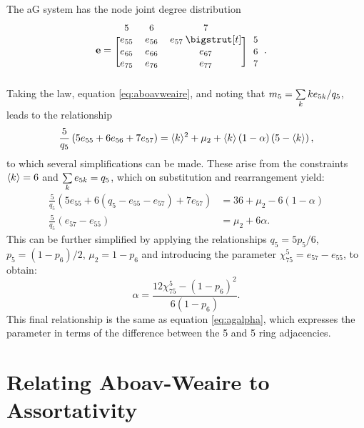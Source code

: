 The aG system has the node joint degree distribution
\begin{align}
	\mathbf{e} &= \begin{blockarray}{*{3}{c} l}
	\begin{block}{*{3}{>{$\footnotesize}c<{$}} l}
	5 & 6 & 7 \\
	\end{block}
	\begin{block}{[*{3}{c}]>{$\footnotesize}l<{$}}
	e_{55} & e_{56} & e_{57} \: \bigstrut[t]& 5\\
	e_{65} & e_{66} & e_{67} & 6 \\
	e_{75} & e_{76} & e_{77} & 7\\
	\end{block}
	\end{blockarray} .
\end{align}
Taking the \aw{} law, equation \eqref{eq:aboavweaire}, and noting that $m_5=\sum\limits_k ke_{5k}/q_5$, leads to the relationship
\begin{equation}
	\frac{5}{q_5}\left(5e_{55}+6e_{56}+7e_{57}\right) = \langle k \rangle^2+\mu_2+\langle k \rangle\left(1-\alpha\right)\left(5-\langle k \rangle\right),
\end{equation}
to which several simplifications can be made.
These arise from the constraints $\langle k \rangle=6$ and $\sum\limits_k e_{5k}=q_5$, which on substitution and rearrangement yield:
\begin{align}
	\frac{5}{q_5}\left(5e_{55}+6\left(q_5-e_{55}-e_{57}\right)+7e_{57}\right) &= 36+\mu_2-6\left(1-\alpha\right) \nonumber \\
	\frac{5}{q_5}\left(e_{57}-e_{55}\right)&=\mu_2+6\alpha.
\end{align}
This can be further simplified by applying the relationships $q_5=5p_5/6$, $p_5=\left(1-p_6\right)/2$, $\mu_2=1-p_6$ and introducing the parameter $\chi_{75}^{5}=e_{57}-e_{55}$, to obtain:
\begin{equation}
	\alpha=\frac{12\chi_{75}^5-\left(1-p_6\right)^2}{6\left(1-p_6\right)}.
\end{equation}
This final relationship is the same as equation \eqref{eq:agalpha}, which expresses the \aw{} parameter in terms of the difference between the 5 and 5 ring adjacencies.

\clearpage
\section{Relating Aboav\--Weaire to Assortativity}
\label{app:derivalphaassort}

